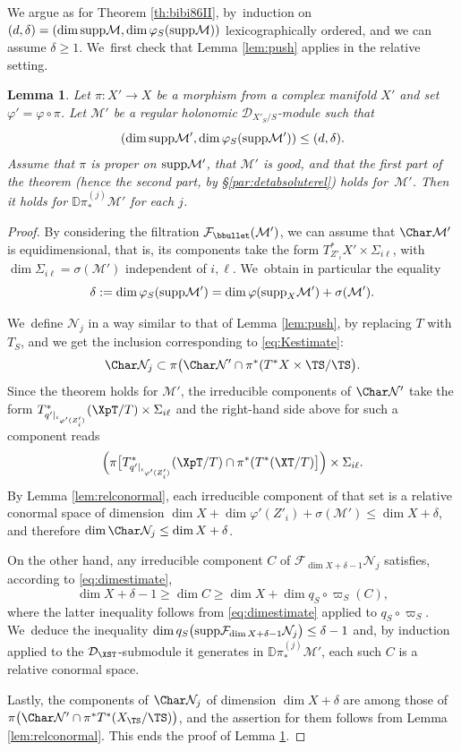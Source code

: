 \documentclass{amsart}
\theoremstyle{plain}
\numberwithin{theorem}{section}
\newtheorem{lemma}[theorem]{Lemma}
\theoremstyle{definition}
\theoremstyle{remark}
\theoremstyle{definition}
\newcommand{\D}{\mathbb{D}}
\newcommand{\cD}{\mathcal{D}}
\newcommand{\cF}{\mathcal{F}}
\newcommand{\cM}{\mathcal{M}}
\newcommand{\cN}{\mathcal{N}}
\newcommand{\supp}{\textup{supp}}
\begin{document}
\label{par:pffirstpartrel}

We argue as for Theorem \ref{th:bibi86II}, by~induction on $(d,\delta)=(\dim\supp\cM,\dim\varphi_S(\supp\cM))$ lexicographically ordered, and we can assume $\delta\geq1$. We~first check that Lemma \ref{lem:push} applies in the relative setting.

\begin{lemma}\label{lem:pushrel}
Let $\pi:X'\to X$ be a morphism from a complex manifold $X'$ and set $\varphi'=\varphi\circ\pi$. Let $\cM'$ be a regular holonomic $\cD_{X'_S/S}$-module such that
\[
(\dim\supp\cM',\dim\varphi_S(\supp\cM'))\leq(d,\delta).
\]
Assume that $\pi$ is proper on $\supp\cM'$, that $\cM'$ is good, and that the first part of the theorem (hence the second part, by \textup\S\ref{par:detabsoluterel}) holds for~$\cM'$. Then it holds for $\D\pi_*^{(j)}\cM'$ for each $j$. 
\end{lemma}

\begin{proof}
By considering the filtration $\cF_\bbullet(\cM')$, we can assume that $\Char\cM'$ is equidimensional, that is, its components take the form $T^*_{Z'_i}X'\times\Sigma_{i\ell}$, with $\dim\Sigma_{i\ell}=\sigma(\cM')$ independent of $i,\ell$. We~obtain in particular the equality
\[
\delta:=\dim\varphi_S(\supp\cM')=\dim\varphi(\supp_X\cM')+\sigma(\cM').
\]

We~define $\cN_j$ in a way similar to that of Lemma \ref{lem:push}, by replacing $T$ with $T_S$, and we get the inclusion corresponding to \eqref{eq:Kestimate}:
\[
\Char\cN_j\subset\pi\bigl(\Char\cN'\cap\pi^*(T^*X\times \TS/\TS\bigr).
\]
Since the theorem holds for $\cM'$, the irreducible components of $\Char\cN'$ take the form $T^*_{q'|_{\iota_{\varphi'(Z'_i)}}}(\XpT/T)\times\Sigma_{i\ell}$ and the right-hand side above for such a component reads
\[
\Bigl(\pi\bigl[T^*_{q'|_{\iota_{\varphi'(Z'_i)}}}(\XpT/T)\cap\pi^*(T^*(\XT/T)\bigr]\Bigr)\times\Sigma_{i\ell}.
\]
By Lemma \ref{lem:relconormal}, each irreducible component of that set is a relative conormal space of dimension $\dim X+\dim\varphi'(Z'_i)+\sigma(\cM')\leq\dim X+\delta$, and therefore $\dim\Char\cN_j\leq \dim X+\delta$.

On the other hand, any irreducible component $C$ of $\cF_{\dim X+\delta-1}\cN_j$ satisfies, according to \eqref{eq:dimestimate},
\[
\dim X+\delta-1\geq\dim C\geq\dim X+\dim q_S\circ\varpi_S(C),
\]
where the latter inequality follows from \eqref{eq:dimestimate} applied to $q_S\circ\varpi_S$. We~deduce the inequality $\dim q_S\bigl(\supp\cF_{\dim X+\delta-1}\cN_j\bigr)\leq\delta-1$ and, by induction applied to the $\cD_{\XST}$-submodule it generates in $\D\pi^{(j)}_*\cM'$, each such $C$ is a relative conormal space.

Lastly, the components of $\Char\cN_j$ of dimension $\dim X+\delta$ are among those of $\pi\bigl(\Char\cN'\cap\pi^*T^*(X_{\TS}/\TS)\bigr)$, and the assertion for them follows from Lemma \ref{lem:relconormal}. This ends the proof of Lemma \ref{lem:pushrel}.
\end{proof}
\end{document}
